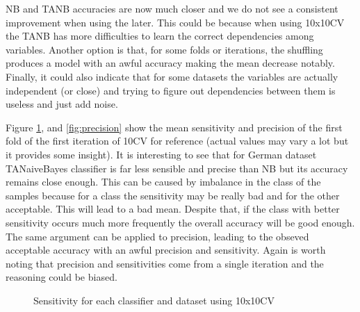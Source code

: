 \documentclass[a4paper,10pt]{article}
\begin{document}
NB and TANB accuracies are now much closer and we do not see a consistent improvement when using the later. This could be because when using 10x10CV the TANB has more difficulties to learn the correct dependencies among variables. Another option is that, for some folds or iterations, the shuffling produces a model with an awful accuracy making the mean decrease notably. Finally, it could also indicate that for some datasets the variables are actually independent (or close) and trying to figure out dependencies between them is useless and just add noise. 

Figure \ref{fig:sensitivity}, and \ref{fig:precision} show the mean sensitivity and precision of the first fold of the first iteration of 10CV for reference (actual values may vary a lot but it provides some insight). It is interesting to see that for German dataset TANaiveBayes classifier is far less sensible and precise than NB but its accuracy remains close enough. This can be caused by imbalance in the class of the samples because for a class the sensitivity may be really bad and for the other acceptable. This will lead to a bad mean. Despite that, if the class with better sensitivity occurs much more frequently the overall accuracy will be good enough. The same argument can be applied to precision, leading to the obseved acceptable accuracy with an awful precision and sensitivity. Again is worth noting that precision and sensitivities come from a single iteration and the reasoning could be biased.


\begin{figure}[H]
\caption{Sensitivity for each classifier and dataset using 10x10CV}
\label{fig:sensitivity}
\end{figure}
\end{document}
